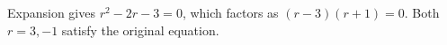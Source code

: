 Expansion gives $r^2-2r-3=0$, which factors as $(r-3)(r+1)=0$. Both $\boxed{r=3,-1}$ satisfy the original equation.
